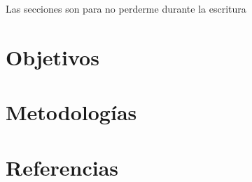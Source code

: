 \documentclass[12pt,letterpaper,draft]{article}
\begin{document}
%
\tableofcontents
\pagebreak
Las secciones son para no perderme durante la escritura




\section {Objetivos}\label{sec:objetivos}
\section {Metodologías}\label{sec:metod}
\section {Referencias}\label{sec:refs}
\printbibliography[heading=none]
\end{document}
